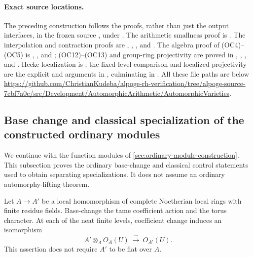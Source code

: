 \paragraph{Exact source locations.}
The preceding construction follows the proofs, rather than just the
output interfaces, in the frozen source
, under
.
The arithmetic smallness proof is
.
The interpolation and contraction proofs are
,
,
, and
.
The algebra proof of (OC4)--(OC5) is
,
, and ; (OC12)--(OC13) and
group-ring projectivity are proved in
, ,
, and .
Hecke localization is ; the fixed-level
comparison and localized projectivity are the explicit
 and  arguments in
, culminating in .
All these file paths are below
\url{https://github.com/ChristianKudeba/alpoge-rh-verification/tree/alpoge-source-7cbf7a0c/src/Development/AutomorphicArithmetic/AutomorphicVarieties}.


\subsection{Base change and classical specialization of the constructed ordinary modules}
\label{sec:ordinary-classical-control}

We continue with the function modules of
\ref{sec:ordinary-module-construction}.  This subsection proves the
ordinary base-change and classical control statements used to obtain
separating specializations.  It does not assume an ordinary
automorphy-lifting theorem.

\begin{srlemma}
\label{lem:ordinary-base-change}
Let \(A\to A'\) be a local homomorphism of complete Noetherian local
rings with finite residue fields.  Base-change the tame coefficient
action and the torus character.  At each of the neat finite levels,
coefficient change induces an isomorphism
\[
 A'\otimes_A O_A(U)\ \xrightarrow{\ \sim\ }\ O_{A'}(U).
 \tag{CC1}
\]
This assertion does not require \(A'\) to be flat over \(A\).
\end{srlemma}

